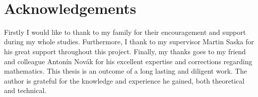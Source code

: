 ~\vfill{}

\section*{Acknowledgements}

Firstly I would like to thank to my family for their encouragement and support during my whole studies. Furthermore, I thank to my supervisor Martin Saska for his great support throughout this project. Finally, my thanks goes to my friend and colleague Antonín Novák for his excellent expertise and corrections regarding mathematics. This thesis is an outcome of a long lasting and diligent work. The author is grateful for the knowledge and experience he gained, both theoretical and technical.

\vspace{2.5cm}

\newpage{}

